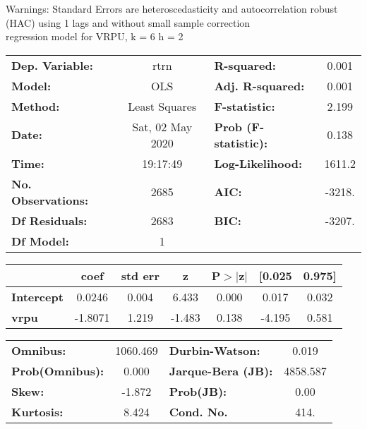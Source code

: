 Warnings: \newline
 [1] Standard Errors are heteroscedasticity and autocorrelation robust (HAC) using 1 lags and without small sample correction\\ 

regression model for VRPU, k = 6 h = 2\begin{center}
\begin{tabular}{lclc}
\toprule
\textbf{Dep. Variable:}    &       rtrn       & \textbf{  R-squared:         } &     0.001   \\
\textbf{Model:}            &       OLS        & \textbf{  Adj. R-squared:    } &     0.001   \\
\textbf{Method:}           &  Least Squares   & \textbf{  F-statistic:       } &     2.199   \\
\textbf{Date:}             & Sat, 02 May 2020 & \textbf{  Prob (F-statistic):} &    0.138    \\
\textbf{Time:}             &     19:17:49     & \textbf{  Log-Likelihood:    } &    1611.2   \\
\textbf{No. Observations:} &        2685      & \textbf{  AIC:               } &    -3218.   \\
\textbf{Df Residuals:}     &        2683      & \textbf{  BIC:               } &    -3207.   \\
\textbf{Df Model:}         &           1      & \textbf{                     } &             \\
\bottomrule
\end{tabular}
\begin{tabular}{lcccccc}
                   & \textbf{coef} & \textbf{std err} & \textbf{z} & \textbf{P$> |$z$|$} & \textbf{[0.025} & \textbf{0.975]}  \\
\midrule
\textbf{Intercept} &       0.0246  &        0.004     &     6.433  &         0.000        &        0.017    &        0.032     \\
\textbf{vrpu}      &      -1.8071  &        1.219     &    -1.483  &         0.138        &       -4.195    &        0.581     \\
\bottomrule
\end{tabular}
\begin{tabular}{lclc}
\textbf{Omnibus:}       & 1060.469 & \textbf{  Durbin-Watson:     } &    0.019  \\
\textbf{Prob(Omnibus):} &   0.000  & \textbf{  Jarque-Bera (JB):  } & 4858.587  \\
\textbf{Skew:}          &  -1.872  & \textbf{  Prob(JB):          } &     0.00  \\
\textbf{Kurtosis:}      &   8.424  & \textbf{  Cond. No.          } &     414.  \\
\bottomrule
\end{tabular}
\end{center}

